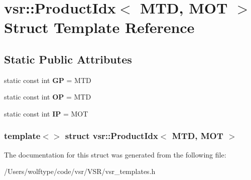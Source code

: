 \hypertarget{structvsr_1_1_product_idx_3_01_m_t_d_00_01_m_o_t_01_4}{\section{vsr\-:\-:Product\-Idx$<$ M\-T\-D, M\-O\-T $>$ Struct Template Reference}
\label{structvsr_1_1_product_idx_3_01_m_t_d_00_01_m_o_t_01_4}
}
\subsection*{Static Public Attributes}
\begin{DoxyCompactItemize}
\item 
\hypertarget{structvsr_1_1_product_idx_3_01_m_t_d_00_01_m_o_t_01_4_a8ecc0997f72871f39357dd306f89f0c2}{static const int {\bfseries G\-P} = M\-T\-D}\label{structvsr_1_1_product_idx_3_01_m_t_d_00_01_m_o_t_01_4_a8ecc0997f72871f39357dd306f89f0c2}

\item 
\hypertarget{structvsr_1_1_product_idx_3_01_m_t_d_00_01_m_o_t_01_4_af17c397ce6beb6029eb3bcb5c933ff4f}{static const int {\bfseries O\-P} = M\-T\-D}\label{structvsr_1_1_product_idx_3_01_m_t_d_00_01_m_o_t_01_4_af17c397ce6beb6029eb3bcb5c933ff4f}

\item 
\hypertarget{structvsr_1_1_product_idx_3_01_m_t_d_00_01_m_o_t_01_4_a1ea93275e2068fb67cdd3083028c6f3a}{static const int {\bfseries I\-P} = M\-O\-T}\label{structvsr_1_1_product_idx_3_01_m_t_d_00_01_m_o_t_01_4_a1ea93275e2068fb67cdd3083028c6f3a}

\end{DoxyCompactItemize}
\subsubsection*{template$<$$>$ struct vsr\-::\-Product\-Idx$<$ M\-T\-D, M\-O\-T $>$}



The documentation for this struct was generated from the following file\-:\begin{DoxyCompactItemize}
\item 
/\-Users/wolftype/code/vsr/\-V\-S\-R/vsr\-\_\-templates.\-h\end{DoxyCompactItemize}
